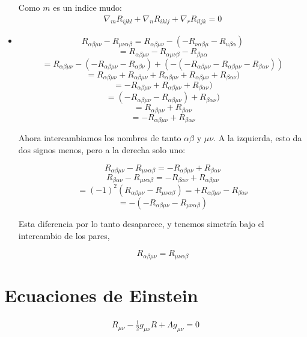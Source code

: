 \documentclass{article}
\begin{document}
\begin{itemize}
    Como $ m  $ es un indice mudo: 
    \begin{gather*}
      \nabla_m R _{ijkl} +\nabla_n  R _{iklj} +\nabla_r  R_{iljk} = 0
    \end{gather*}
  \item 
    \[
    R_{\alpha \beta \mu \nu} - R_{\mu \nu \alpha \beta} = R_{\alpha \beta \mu \nu} - (-R_{\nu \alpha \beta \mu} - R_{u \beta \alpha})
    \]
    \[
    = R_{\alpha \beta \mu \nu} - R_{\alpha \mu \nu \beta} - R_{\beta \mu \alpha}
    \]
    \[
    = R_{\alpha \beta \mu \nu} - (-R_{\alpha \beta \mu \nu} - R_{\alpha \beta \nu}) + (-(-R_{\alpha \beta \mu \nu} - R_{\alpha \beta \mu \nu} - R_{\beta \alpha \nu}))
    \]
    \[
    = R_{\alpha \beta \mu \nu} + R_{\alpha \beta \mu \nu} + R_{\alpha \beta \mu \nu} + R_{\alpha \beta \mu \nu} + R_{\beta \alpha \nu})
    \]
    \[
    = -R_{\alpha \beta \mu \nu} + R_{\alpha \beta \mu \nu} + R_{\beta \alpha \nu})
    \]
    \[
    = (-R_{\alpha \beta \mu \nu} - R_{\alpha \beta \mu \nu}) + R_{\beta \alpha \nu})
    \]
    \[
    = R_{\alpha \beta \mu \nu} + R_{\beta \alpha \nu}
    \]
    \[
    = -R_{\alpha \beta \mu \nu} + R_{\beta \alpha \nu}
    \]

    Ahora intercambiamos los nombres de tanto $\alpha \beta$ y $\mu \nu$. A la izquierda, esto da dos signos menos, pero a la derecha solo uno:

    \[
    R_{\alpha \beta \mu \nu} - R_{\mu \nu \alpha \beta} = -R_{\alpha \beta \mu \nu} + R_{\beta \alpha \nu}
    \]
    \[
    R_{\beta \alpha \nu} - R_{\mu \nu \alpha \beta} = -R_{\beta \alpha \nu} + R_{\alpha \beta \mu \nu}
    \]
    \[
    =(-1)^2 (R_{\alpha \beta \mu \nu} - R_{\mu \nu \alpha \beta}) = +R_{\alpha \beta \mu \nu} - R_{\beta \alpha \nu}
    \]
    \[
    = -(-R_{\alpha \beta \mu \nu} - R_{\mu \nu \alpha \beta})
    \]

    Esta diferencia por lo tanto desaparece, y tenemos simetría bajo el intercambio de los pares,

    \[
    R_{\alpha \beta \mu \nu} = R_{\mu \nu \alpha \beta}
    \]
\end{itemize}

\hfill 

\hfill 

\section{Ecuaciones de Einstein }
\begin{gather*}
  R _{\mu\nu} - \frac{1}{2} g _{\mu\nu} R + \Lambda g_{\mu\nu} =0 
\end{gather*}
\end{document}
